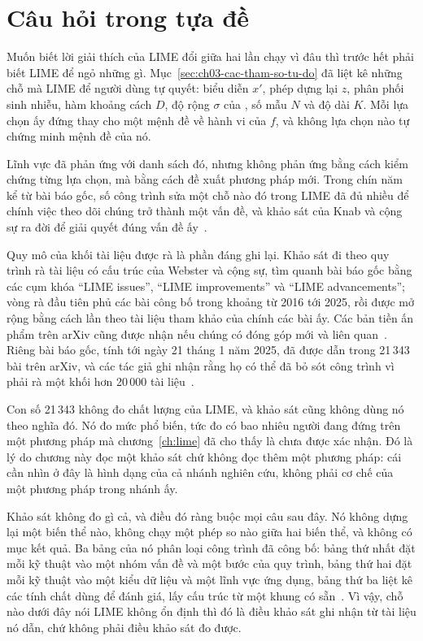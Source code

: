\section{Câu hỏi trong tựa đề}
\label{sec:ch10-cau-hoi-trong-tua-de}

%
%
Muốn biết lời giải thích của LIME đổi giữa hai lần chạy vì đâu thì trước hết
phải biết LIME để ngỏ những gì.
Mục~\ref{sec:ch03-cac-tham-so-tu-do} đã liệt kê những chỗ mà LIME để người dùng
tự quyết: biểu diễn $x'$, phép dựng lại $z$, phân phối sinh nhiễu, hàm khoảng
cách $D$, độ rộng $\sigma$ của , số mẫu $N$ và độ dài $K$.
Mỗi lựa chọn ấy đứng thay cho một mệnh đề về hành vi của $f$, và không lựa chọn
nào tự chứng minh mệnh đề của nó.

Lĩnh vực đã phản ứng với danh sách đó, nhưng không phản ứng bằng cách kiểm
chứng từng lựa chọn, mà bằng cách đề xuất phương pháp mới. Trong chín năm kể
từ bài báo gốc, số công trình sửa một chỗ nào đó trong LIME đã đủ nhiều để chính
việc theo dõi chúng trở thành một vấn đề, và khảo sát của Knab và cộng sự ra đời
để giải quyết đúng vấn đề ấy~\autocite{p22whichlime}.

Quy mô của khối tài liệu được rà là phần đáng ghi lại. Khảo sát đi theo quy trình rà tài
liệu có cấu trúc của Webster và cộng sự, tìm quanh bài báo gốc bằng các cụm khóa
\enquote{LIME issues}, \enquote{LIME improvements} và \enquote{LIME
advancements}; vòng rà đầu tiên phủ các bài công bố trong khoảng từ 2016 tới
2025, rồi được mở rộng bằng cách lần theo tài liệu tham khảo của chính các bài
ấy. Các bản tiền ấn phẩm trên arXiv cũng được nhận nếu chúng có đóng góp mới và
liên quan~\autocite{p22whichlime}. Riêng bài báo gốc, tính tới ngày 21 tháng 1
năm 2025, đã được dẫn trong 21\,343 bài trên arXiv, và các tác giả ghi nhận rằng
họ có thể đã bỏ sót công trình vì phải rà một khối hơn 20\,000
tài liệu~\autocite{p22whichlime}.

Con số 21\,343 không đo chất lượng của LIME, và khảo sát cũng không dùng nó theo
nghĩa đó. Nó đo mức phổ biến, tức đo có bao nhiêu người đang đứng trên một
phương pháp mà chương~\ref{ch:lime} đã cho thấy là chưa được xác nhận. Đó là lý
do chương này đọc một khảo sát chứ không đọc thêm một phương pháp: cái cần nhìn
ở đây là hình dạng của cả nhánh nghiên cứu, không phải cơ chế của một phương
pháp trong nhánh ấy.

Khảo sát không đo gì cả, và điều đó ràng buộc mọi câu sau đây. Nó không dựng lại một biến thể nào,
không chạy một phép so nào giữa hai biến thể, và không có mục kết quả. Ba bảng
của nó phân loại công trình đã công bố: bảng thứ nhất đặt mỗi kỹ thuật vào một
nhóm vấn đề và một bước của quy trình, bảng thứ hai đặt mỗi kỹ thuật vào một
kiểu dữ liệu và một lĩnh vực ứng dụng, bảng thứ ba liệt kê các tính chất dùng
để đánh giá, lấy cấu trúc từ một khung có sẵn~\autocite{p22whichlime}. Vì vậy,
chỗ nào dưới đây nói LIME không ổn định thì đó là điều khảo sát ghi nhận từ tài
liệu nó dẫn, chứ không phải điều khảo sát đo được.
